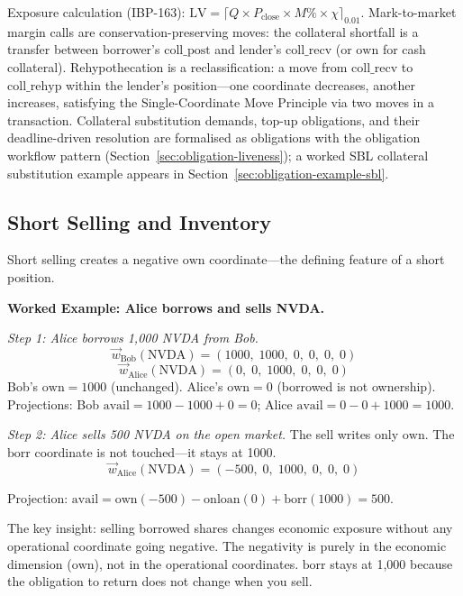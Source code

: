 \documentclass[11pt,a4paper]{article}
\begin{document}
Exposure calculation (IBP-163): $\mathrm{LV} = \lceil Q \times P_{\mathrm{close}} \times M\% \times \chi \rceil_{0.01}$. Mark-to-market margin calls are conservation-preserving moves: the collateral shortfall is a transfer between borrower's $\mathrm{coll\_post}$ and lender's $\mathrm{coll\_recv}$ (or $\mathrm{own}$ for cash collateral). Rehypothecation is a reclassification: a move from $\mathrm{coll\_recv}$ to $\mathrm{coll\_rehyp}$ within the lender's position---one coordinate decreases, another increases, satisfying the Single-Coordinate Move Principle via two moves in a transaction. Collateral substitution demands, top-up obligations, and their deadline-driven resolution are formalised as obligations with the obligation workflow pattern (Section~\ref{sec:obligation-liveness}); a worked SBL collateral substitution example appears in Section~\ref{sec:obligation-example-sbl}.

\subsection{Short Selling and Inventory}
\label{sec:sbl-short-selling}

Short selling creates a negative $\mathrm{own}$ coordinate---the defining feature of a short position.

\medskip
\noindent\textbf{Worked Example: Alice borrows and sells NVDA.}

\noindent\textit{Step 1: Alice borrows 1{,}000 NVDA from Bob.}
\[
\vec{w}_{\mathrm{Bob}}(\text{NVDA}) = (1000,\; 1000,\; 0,\; 0,\; 0,\; 0)
\]
\[
\vec{w}_{\mathrm{Alice}}(\text{NVDA}) = (0,\; 0,\; 1000,\; 0,\; 0,\; 0)
\]
Bob's $\mathrm{own} = 1000$ (unchanged). Alice's $\mathrm{own} = 0$ (borrowed is not ownership). Projections: Bob $\mathrm{avail} = 1000 - 1000 + 0 = 0$; Alice $\mathrm{avail} = 0 - 0 + 1000 = 1000$. \checkmark

\noindent\textit{Step 2: Alice sells 500 NVDA on the open market.} The sell writes only $\mathrm{own}$. The $\mathrm{borr}$ coordinate is not touched---it stays at 1000.
\[
\vec{w}_{\mathrm{Alice}}(\text{NVDA}) = (-500,\; 0,\; 1000,\; 0,\; 0,\; 0)
\]

\noindent Projection: $\mathrm{avail} = \mathrm{own}(-500) - \mathrm{onloan}(0) + \mathrm{borr}(1000) = 500$. \checkmark

\noindent The key insight: selling borrowed shares changes economic exposure without any operational coordinate going negative. The negativity is purely in the economic dimension ($\mathrm{own}$), not in the operational coordinates. $\mathrm{borr}$ stays at 1{,}000 because the obligation to return does not change when you sell.
\end{document}
